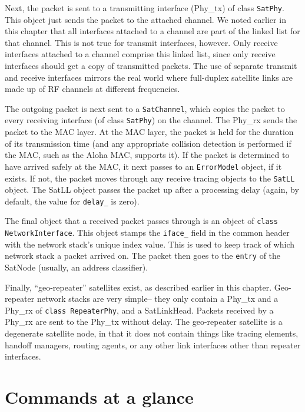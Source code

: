 Next, the packet is sent to a transmitting interface (Phy\_tx) of class 
{\tt SatPhy}.  This
object just sends the packet to the attached channel.  We noted earlier
in this chapter that all interfaces attached to a channel are part of the
linked list for that channel.  This is not true for transmit interfaces,
however.  Only receive interfaces attached to a channel comprise this linked
list, since only receive interfaces should get a copy of transmitted packets.
The use of separate transmit and receive interfaces mirrors the real world
where full-duplex satellite links are made up of RF channels at different
frequencies.

The outgoing packet is next sent to a {\tt SatChannel}, which copies the
packet to every receiving interface (of class {\tt SatPhy}) on the channel. 
The Phy\_rx sends the packet to the MAC layer.  At the MAC layer, the packet
is held for the duration of its transmission time (and any appropriate
collision detection is performed if the MAC, such as the Aloha MAC,
supports it).  If the packet is determined to have arrived safely at the MAC,
it next passes to an {\tt ErrorModel} object, if it exists.  If not, the
packet moves through any receive tracing objects to the {\tt SatLL}
object.  The SatLL object passes the packet up after a processing delay
(again, by default, the value for {\tt delay\_} is zero).

The final object that a received packet passes through is an object of
{\tt class NetworkInterface}.  This object stamps the {\tt iface\_} field
in the common header with the network stack's unique index value.  This
is used to keep track of which network stack a packet arrived on.  The
packet then goes to the {\tt entry} of the SatNode (usually, an address
classifier).  

Finally, ``geo-repeater'' satellites exist, as described earlier in this
chapter.  Geo-repeater network stacks are very simple-- they only contain
a Phy\_tx and a Phy\_rx of {\tt class RepeaterPhy}, and a SatLinkHead.  
Packets received by a Phy\_rx are sent to the Phy\_tx without delay.  The
geo-repeater satellite is a degenerate satellite node, in that it does not
contain things like tracing elements, handoff managers, routing agents, or 
any other link interfaces other than repeater interfaces.


\section{Commands at a glance}
\label{sec:satcommands}

